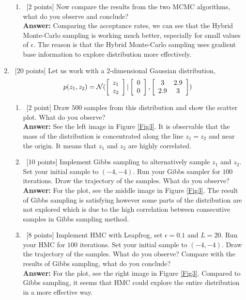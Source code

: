 \documentclass[12pt, fullpage,letterpaper]{article}
\def\red{\color{black!30!red}}
\def\blackblue{\color{black!40!blue}}
\begin{document}
\begin{enumerate}
\begin{enumerate}
		\item~[2 points] Now compare the results from the two MCMC algorithms, what do you observe and conclude? \\
{\bf \red Answer: }{\blackblue 
Comparing the acceptance rates, we can see that the Hybrid Monte-Carlo sampling is working much better, especially for small values of $\epsilon$.  
The reason is that the Hybrid Monte-Carlo sampling uses gradient base information to explore distribution more effectively.  
}
	\end{enumerate}

	\item~[20 points] Let us work with a 2-dimensional Gaussian distribution, 
	\[
	p(z_1, z_2) = \mathcal{N}(\left[\begin{array}{c}z_1\\z_2
	\end{array}\right] | \left[\begin{array}{c}0\\0
	\end{array}\right], \left[\begin{array}{cc} 3 & 2.9\\2.9 & 3\end{array} \right])
	\]
	\begin{enumerate}
		\item~[2 point] Draw $500$ samples from this distribution and show the scatter plot. What do you observe?\\
{\bf \red Answer: }{\blackblue 
See the left image in Figure \ref{Fig3}. It is observable that the mass of the distribution is concentrated along the line $z_1=z_2$ and near the origin. 
It means that $z_1$ and $z_2$ are highly correlated. 
}
		\item~[10 points] Implement Gibbs sampling to alternatively sample $z_1$ and $z_2$. Set your initial sample to $(-4, -4)$. Run your Gibbs sampler for $100$ iterations. Draw the trajectory of the samples. What do you observe?\\
		{\bf \red Answer: }{\blackblue 
For the plot, see the middle image in Figure \ref{Fig3}. 
The result of Gibbs sampling is satisfying however some parts of the distribution are not explored which is due to the high correlation between consecutive samples in Gibbs sampling method. 
}
		\item~[8 points] Implement HMC with Leapfrog, set $\epsilon = 0.1$ and $L=20$. Run your HMC for $100$ iterations. Set your initial sample to $(-4, -4)$. Draw the trajectory of the samples. What do you observe? Compare with the results of Gibbs sampling, what do you conclude?\\
		{\bf \red Answer: }{\blackblue 
For the plot, see the right image in Figure \ref{Fig3}. 
Compared to Gibbs sampling, it seems that HMC could explore the entire distribution in a more effective way. 
}
		

\end{enumerate}
\end{enumerate}
\end{document}
